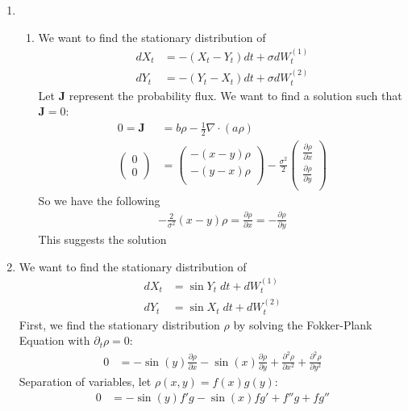 \documentclass[12pt]{article}
\theoremstyle{plain}
\theoremstyle{definition}
\theoremstyle{remark}
\begin{document}
\begin{enumerate}
  \item %
    \begin{enumerate}
      \item %
        We want to find the stationary distribution of
        \begin{align*}
          dX_t &= -(X_t - Y_t)dt + \sigma dW_t^{(1)} \\
          dY_t &= -(Y_t - X_t)dt + \sigma dW_t^{(2)}
        \end{align*}
        Let $\mathbf{J}$ represent the probability flux. We want to find
        a solution such that
        $\mathbf{J}=0$:
        \begin{align*}
          0 = \mathbf{J} &= b\rho - \frac{1}{2}\nabla\cdot(a\rho)\\
          \begin{pmatrix}
            0 \\ 0
          \end{pmatrix}
          &=
          \begin{pmatrix}
            -(x-y) \rho \\
            -(y-x) \rho \\
          \end{pmatrix}
          - \frac{\sigma^2}{2}
          \begin{pmatrix}
            \frac{\partial \rho}{\partial x} \\
            \frac{\partial \rho}{\partial y} \\
          \end{pmatrix}
        \end{align*}
        So we have the following
        \begin{align*}
          -\frac{2}{\sigma^2} (x-y) \rho
          = \frac{\partial \rho}{\partial x}
          = -\frac{\partial \rho}{\partial y}
        \end{align*}
        This suggests the solution 
    \end{enumerate}

      \item %
        We want to find the stationary distribution of
        \begin{align*}
          dX_t &= \sin Y_t \; dt + dW_t^{(1)} \\
          dY_t &= \sin X_t \; dt + dW_t^{(2)}
        \end{align*}
        First, we find the stationary distribution $\rho$ by solving the
        Fokker-Plank Equation with $\partial_t \rho=0$:
        \begin{align*}
          0 &=
          - \sin(y) \frac{\partial \rho}{\partial x}
          - \sin(x) \frac{\partial \rho}{\partial y}
          + \frac{\partial^2 \rho}{\partial x^2}
          + \frac{\partial^2 \rho}{\partial y^2}
        \end{align*}
        Separation of variables, let $\rho(x,y) = f(x) g(y)$:
        \begin{align*}
          0 &=
          - \sin(y) f' g
          - \sin(x) f g'
          + f'' g
          + f g''\\
        \end{align*}



\end{enumerate}
\end{document}
